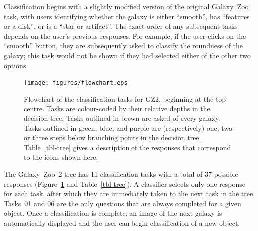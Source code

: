 \documentclass[useAMS,usenatbib]{mn2e}
\begin{document}
Classification begins with a slightly modified version of the original Galaxy~Zoo task, with users identifying whether the galaxy is either ``smooth'', has ``features or a disk'', or is a ``star or artifact''. The exact order of any subsequent tasks depends on the user's previous responses. For example, if the user clicks on the ``smooth'' button, they are subsequently asked to classify the roundness of the galaxy; this task would not be shown if they had selected either of the other two options. 

\begin{figure}
\texttt{[image: figures/flowchart.eps]}
\caption{Flowchart of the classification tasks for GZ2, beginning at the top centre. Tasks are colour-coded by their relative depths in the decision tree. Tasks outlined in brown are asked of every galaxy. Tasks outlined in green, blue, and purple are (respectively) one, two or three steps below branching points in the decision tree. Table~\ref{tbl-tree} gives a description of the responses that correspond to the icons shown here. 
\label{fig-flowchart}}
\end{figure}

The Galaxy~Zoo~2 tree has 11 classification tasks with a total of 37 possible responses (Figure~\ref{fig-flowchart} and Table~\ref{tbl-tree}). A classifier selects only one response for each task, after which they are immediately taken to the next task in the tree. Tasks~01 and 06 are the only questions that are always completed for a given object. Once a classification is complete, an image of the next galaxy is automatically displayed and the user can begin classification of a new object. 
\end{document}
